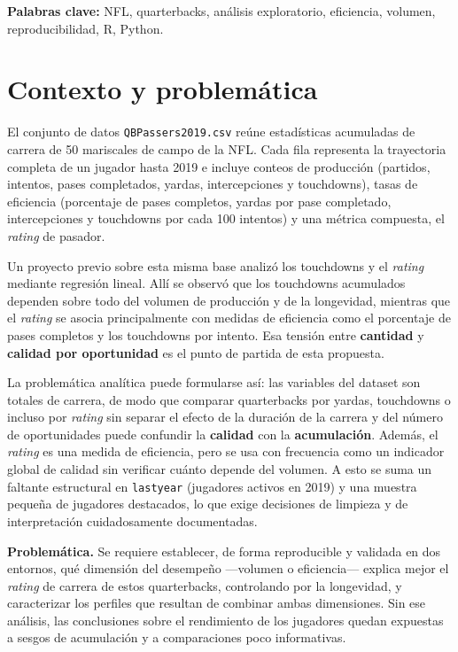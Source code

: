 \documentclass[11pt,a4paper]{article}
\begin{document}
\textbf{Palabras clave:} NFL, quarterbacks, análisis exploratorio, eficiencia, volumen, reproducibilidad, R, Python.

\newpage

\section{Contexto y problemática}
El conjunto de datos \texttt{QBPassers2019.csv} reúne estadísticas acumuladas de carrera de 50 mariscales de campo de la NFL. Cada fila representa la trayectoria completa de un jugador hasta 2019 e incluye conteos de producción (partidos, intentos, pases completados, yardas, intercepciones y touchdowns), tasas de eficiencia (porcentaje de pases completos, yardas por pase completado, intercepciones y touchdowns por cada 100 intentos) y una métrica compuesta, el \textit{rating} de pasador.

Un proyecto previo sobre esta misma base analizó los touchdowns y el \textit{rating} mediante regresión lineal. Allí se observó que los touchdowns acumulados dependen sobre todo del volumen de producción y de la longevidad, mientras que el \textit{rating} se asocia principalmente con medidas de eficiencia como el porcentaje de pases completos y los touchdowns por intento. Esa tensión entre \textbf{cantidad} y \textbf{calidad por oportunidad} es el punto de partida de esta propuesta.

La problemática analítica puede formularse así: las variables del dataset son totales de carrera, de modo que comparar quarterbacks por yardas, touchdowns o incluso por \textit{rating} sin separar el efecto de la duración de la carrera y del número de oportunidades puede confundir la \textbf{calidad} con la \textbf{acumulación}. Además, el \textit{rating} es una medida de eficiencia, pero se usa con frecuencia como un indicador global de calidad sin verificar cuánto depende del volumen. A esto se suma un faltante estructural en \texttt{lastyear} (jugadores activos en 2019) y una muestra pequeña de jugadores destacados, lo que exige decisiones de limpieza y de interpretación cuidadosamente documentadas.

\textbf{Problemática.} Se requiere establecer, de forma reproducible y validada en dos entornos, qué dimensión del desempeño —volumen o eficiencia— explica mejor el \textit{rating} de carrera de estos quarterbacks, controlando por la longevidad, y caracterizar los perfiles que resultan de combinar ambas dimensiones. Sin ese análisis, las conclusiones sobre el rendimiento de los jugadores quedan expuestas a sesgos de acumulación y a comparaciones poco informativas.
\end{document}
